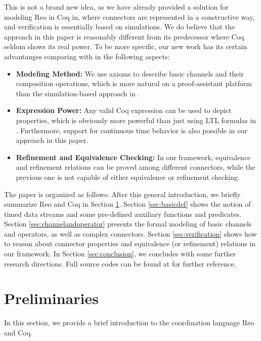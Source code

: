 \documentclass{llncs}
\begin{document}
This is not a brand new idea, as we have already provided a solution for modeling Reo in
Coq in\cite{LS15}, where connectors are represented in a constructive way, and
verification is essentially based on simulations. We do believe that the approach in this paper is reasonably different from
its predecessor where Coq seldom shows its real power. To be more specific, our new work has its certain
advantanges comparing with \cite{LS15} in the following
aspects:
\begin{itemize}
\item {\bf Modeling Method:} We use axioms to describe basic channels and their composition operations, which is more natural on a proof-assistant
platform than the simulation-based approach in \cite{LS15}.
\item {\bf Expression Power:} Any valid Coq expression can be used to depict properties, which is obviously more powerful than just using LTL formulas in
\cite{LS15}. Furthermore, support for continuous time behavior is also
possible in our approach in this paper.
\item {\bf Refinement and Equivalence Checking:} In our framework, equivalence and refinement relations can be proved among different connectors, while the
previous one is not capable of either equivalence or refinement checking.
\end{itemize}


The paper is organized as follows: After this general introduction, we briefly summarize Reo and Coq
in Section \ref{sec:pre}. Section \ref{sec:basicdef} shows the notion of timed data streams and some
pre-defined auxiliary functions and predicates. Section \ref{sec:channelandoperator} presents the
formal modeling of basic channels and operators, as well as complex connectors. Section
\ref{sec:verification} shows how to reason about connector properties and equivalence (or
refinement) relations in our framework.
In Section \ref{sec:conclusion}, we concludes with some further research directions. Full source codes can be found at \cite{reo2coqfile} for further reference.

\section{Preliminaries}\label{sec:pre}

In this section, we provide a brief introduction to the coordination language Reo and Coq.
\end{document}
